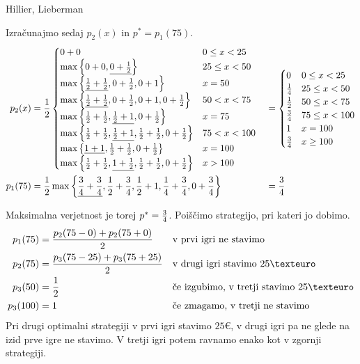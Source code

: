 \begin{naloga}{Hillier, Lieberman}{\cite[Problem~11.4-1]{hl}}
\begin{odgovor}
Izračunajmo sedaj $p_2(x)$ in $p^* = p_1(75)$.
\begin{alignat*}{2}
p_2(x) &= {1 \over 2} \begin{cases}
0+0 & 0 \le x < 25 \\
\max\left\{0+0, \underline{0+{1 \over 2}}\right\} & 25 \le x < 50 \\
\max\left\{\underline{{1 \over 2}+{1 \over 2}}, 0+{1 \over 2},
           0+1\right\} & x = 50 \\
\max\left\{\underline{{1 \over 2}+{1 \over 2}}, 0+{1 \over 2},
           0+1, 0+{1 \over 2}\right\} & 50 < x < 75 \\
\max\left\{{1 \over 2}+{1 \over 2}, \underline{{1 \over 2}+1},
           0+{1 \over 2}\right\} & x = 75 \\
\max\left\{{1 \over 2}+{1 \over 2}, \underline{{1 \over 2}+1},
           {1 \over 2}+{1 \over 2}, 0+{1 \over 2}\right\} & 75 < x < 100 \\
\max\left\{\underline{1+1}, {1 \over 2}+{1 \over 2},
           0+{1 \over 2}\right\} & x = 100 \\
\max\left\{{1 \over 2}+{1 \over 2}, \underline{1+{1 \over 2}},
           {1 \over 2}+{1 \over 2}, 0+{1 \over 2}\right\} & x > 100
\end{cases}
&&= \begin{cases}
0 & 0 \le x < 25 \\
{1 \over 4} & 25 \le x < 50 \\
{1 \over 2} & 50 \le x < 75 \\
{3 \over 4} & 75 \le x < 100 \\
1 & x = 100 \\
{3 \over 4} & x \ge 100
\end{cases} \\
p_1(75) &= {1 \over 2} \max\left\{\underline{{3 \over 4}+{3 \over 4}},
                                  {1 \over 2}+{3 \over 4},
                                  {1 \over 2}+1,
                                  {1 \over 4}+{3 \over 4},
                                  0+{3 \over 4}\right\} &&= {3 \over 4}
\end{alignat*}

\needspace{\baselineskip}
\noindent
Maksimalna verjetnost je torej $p^* = {3 \over 4}$.
Poiščimo strategijo, pri kateri jo dobimo.
\begin{align*}
p_1(75) &= {p_2(75-0) + p_2(75+0) \over 2}
&& \text{v prvi igri ne stavimo} \\
p_2(75) &= {p_3(75-25) + p_3(75+25) \over 2}
&& \text{v drugi igri stavimo $25 €$} \\
p_3(50) &= {1 \over 2}
&& \text{če izgubimo, v tretji stavimo $25 €$} \\
p_3(100) &= 1
&& \text{če zmagamo, v tretji ne stavimo}
\end{align*}
Pri drugi optimalni strategiji v prvi igri stavimo $25 €$,
v drugi igri pa ne glede na izid prve igre ne stavimo.
V tretji igri potem ravnamo enako kot v zgornji strategiji.
\end{odgovor}
\end{naloga}
